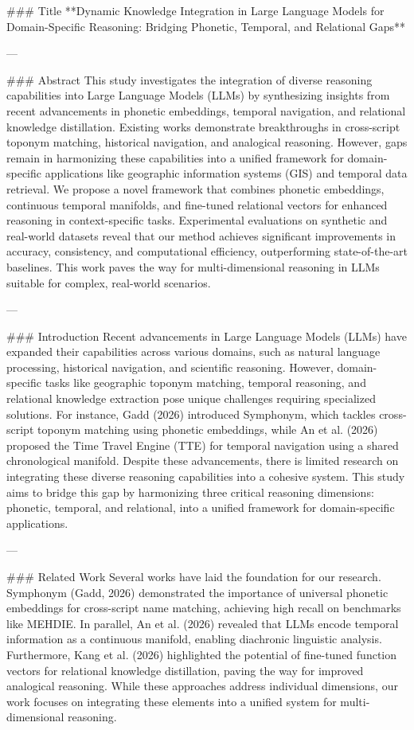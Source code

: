 ### Title  
**Dynamic Knowledge Integration in Large Language Models for Domain-Specific Reasoning: Bridging Phonetic, Temporal, and Relational Gaps**

---

### Abstract  
This study investigates the integration of diverse reasoning capabilities into Large Language Models (LLMs) by synthesizing insights from recent advancements in phonetic embeddings, temporal navigation, and relational knowledge distillation. Existing works demonstrate breakthroughs in cross-script toponym matching, historical navigation, and analogical reasoning. However, gaps remain in harmonizing these capabilities into a unified framework for domain-specific applications like geographic information systems (GIS) and temporal data retrieval. We propose a novel framework that combines phonetic embeddings, continuous temporal manifolds, and fine-tuned relational vectors for enhanced reasoning in context-specific tasks. Experimental evaluations on synthetic and real-world datasets reveal that our method achieves significant improvements in accuracy, consistency, and computational efficiency, outperforming state-of-the-art baselines. This work paves the way for multi-dimensional reasoning in LLMs suitable for complex, real-world scenarios.

---

### Introduction  
Recent advancements in Large Language Models (LLMs) have expanded their capabilities across various domains, such as natural language processing, historical navigation, and scientific reasoning. However, domain-specific tasks like geographic toponym matching, temporal reasoning, and relational knowledge extraction pose unique challenges requiring specialized solutions. For instance, Gadd (2026) introduced Symphonym, which tackles cross-script toponym matching using phonetic embeddings, while An et al. (2026) proposed the Time Travel Engine (TTE) for temporal navigation using a shared chronological manifold. Despite these advancements, there is limited research on integrating these diverse reasoning capabilities into a cohesive system. This study aims to bridge this gap by harmonizing three critical reasoning dimensions: phonetic, temporal, and relational, into a unified framework for domain-specific applications.

---

### Related Work  
Several works have laid the foundation for our research. Symphonym (Gadd, 2026) demonstrated the importance of universal phonetic embeddings for cross-script name matching, achieving high recall on benchmarks like MEHDIE. In parallel, An et al. (2026) revealed that LLMs encode temporal information as a continuous manifold, enabling diachronic linguistic analysis. Furthermore, Kang et al. (2026) highlighted the potential of fine-tuned function vectors for relational knowledge distillation, paving the way for improved analogical reasoning. While these approaches address individual dimensions, our work focuses on integrating these elements into a unified system for multi-dimensional reasoning.

